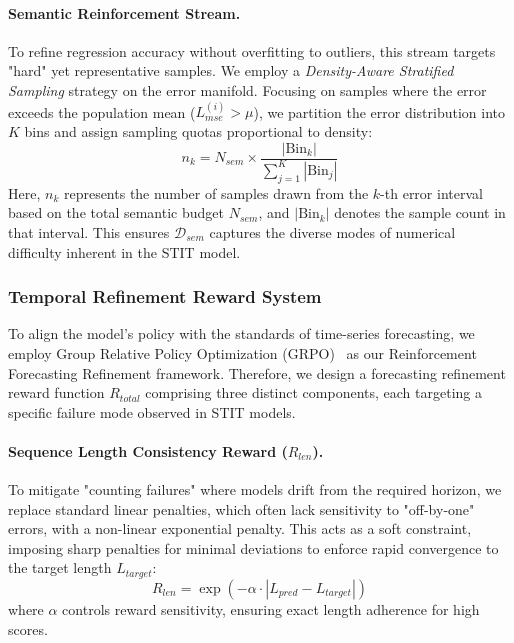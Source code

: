 \paragraph{Semantic Reinforcement Stream.}
To refine regression accuracy without overfitting to outliers, this stream targets "hard" yet representative samples. We employ a \textit{Density-Aware Stratified Sampling} strategy on the error manifold. Focusing on samples where the error exceeds the population mean ($L_{mse}^{(i)} > \mu$), we partition the error distribution into $K$ bins and assign sampling quotas proportional to density:
\begin{equation}
    n_k = N_{sem} \times \frac{|\text{Bin}_k|}{\sum_{j=1}^{K} |\text{Bin}_j|}
\end{equation}
Here, $n_k$ represents the number of samples drawn from the $k$-th error interval based on the total semantic budget $N_{sem}$, and $|\text{Bin}_k|$ denotes the sample count in that interval. This ensures $\mathcal{D}_{sem}$ captures the diverse modes of numerical difficulty inherent in the STIT model.


\subsubsection{Temporal Refinement Reward System}
To align the model's policy with the standards of time-series forecasting, we employ Group Relative Policy Optimization (GRPO)~\citep{deepseekai2025deepseekr1} as our Reinforcement Forecasting Refinement framework. Therefore, we design a forecasting refinement reward function $R_{total}$ comprising three distinct components, each targeting a specific failure mode observed in STIT models.


\paragraph{Sequence Length Consistency Reward ($R_{len}$).}
To mitigate "counting failures" where models drift from the required horizon, we replace standard linear penalties, which often lack sensitivity to "off-by-one" errors, with a non-linear exponential penalty. This acts as a soft constraint, imposing sharp penalties for minimal deviations to enforce rapid convergence to the target length $L_{target}$:
\begin{equation}
    R_{len} = \exp(-\alpha \cdot |L_{pred} - L_{target}|)
\end{equation}
where $\alpha$ controls reward sensitivity, ensuring exact length adherence for high scores.


